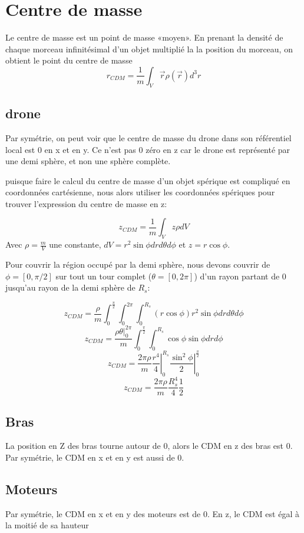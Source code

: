 \documentclass[12pt]{article}
\begin{document}
\section{Centre de masse}
Le centre de masse est un point de masse «moyen». En prenant la densité de chaque morceau infinitésimal d’un objet multiplié la la position du morceau, on obtient le point du centre de masse
$$r_{CDM}=\frac{1}{m}\int_V \vec{r}\rho (\vec{r}) d^3 r$$

\subsection{drone}
Par symétrie, on peut voir que le centre de masse du drone dans son référentiel local est 0 en x et en y. Ce n’est pas 0 zéro en z car le drone est représenté par une demi sphère, et non une sphère complète. 

puisque faire le calcul du centre de masse d'un objet spérique est compliqué en coordonnées cartésienne, nous alors utiliser les coordonnées spériques pour trouver l'expression du centre de masse en z:

$$z_{CDM} = \frac{1}{m}\int_Vz\rho dV$$
Avec $\rho = \frac{m}{V}$ une constante, $dV = r^2\sin\phi drd\theta d\phi$ et $z=r\cos\phi$.

Pour couvrir la région occupé par la demi sphère, nous devons couvrir de $\phi=[0, \pi/2]$ sur tout un tour complet ($\theta=[0, 2\pi]$) d'un rayon partant de 0 jusqu'au rayon de la demi sphère de $R_s$:

$$z_{CDM} = \frac{\rho}{m}\int_0^{\frac{\pi}{2}}\int_0^{2\pi}\int_0^{R_s} (r\cos\phi)r^2\sin\phi drd\theta d\phi$$
$$z_{CDM} = \frac{\rho\theta |_0^{2\pi}}{m}\int_0^{\frac{\pi}{2}}\int_0^{R_s}\cos\phi\sin\phi drd\phi$$
$$z_{CDM} = \frac{2\pi\rho}{m} \left.\frac{r^4}{4} \right|_0^{R_s}
\left.\frac{\sin^2\phi}{2} \right|_0^{\frac{\pi}{2}}$$
$$z_{CDM} = \frac{2\pi\rho}{m} \frac{R_s^4}{4} \frac{1}{2}$$

\subsection{Bras}
La position en Z des bras tourne autour de 0, alors le CDM en z des bras est 0. Par symétrie, le CDM en x et en y est aussi de 0.

\subsection{Moteurs}
Par symétrie, le CDM en x et en y des moteurs est de 0. En z, le CDM est égal à la moitié de sa hauteur
\end{document}
